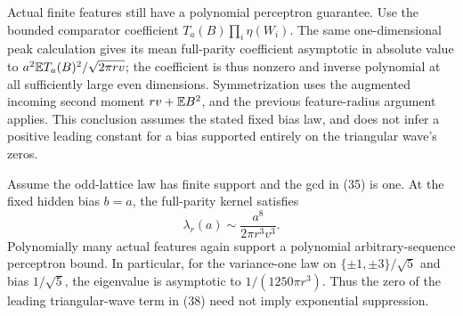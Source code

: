 Actual finite features still have a polynomial perceptron guarantee. Use the bounded comparator coefficient
$T_a(B)\prod_i\eta(W_i)$. The same one-dimensional peak calculation
gives its mean full-parity coefficient asymptotic in absolute value to
$a^2\mathbb E T_a(B)^2/\sqrt{2\pi rv}$; the coefficient is thus nonzero and
inverse polynomial at all sufficiently large even dimensions.
Symmetrization uses the augmented incoming second moment $rv+\mathbb E B^2$,
and the previous feature-radius argument applies. This conclusion assumes
the stated fixed bias law, and does not infer a positive leading constant
for a bias supported entirely on the triangular wave's zeros.

\begin{theorem}
Assume the odd-lattice law has finite support and the gcd in (35) is one.
At the fixed hidden bias $b=a$, the full-parity kernel satisfies
\[
             \lambda_r(a)\sim\frac{a^8}{2\pi r^3v^3}.
 \tag{39}
\]
Polynomially many actual features again support a polynomial
arbitrary-sequence perceptron bound. In particular, for the variance-one
law on $\{\pm1,\pm3\}/\sqrt5$ and bias $1/\sqrt5$, the eigenvalue
is asymptotic to $1/(1250\pi r^3)$. Thus the zero of the leading
triangular-wave term in (38) need not imply exponential suppression.
\end{theorem}
